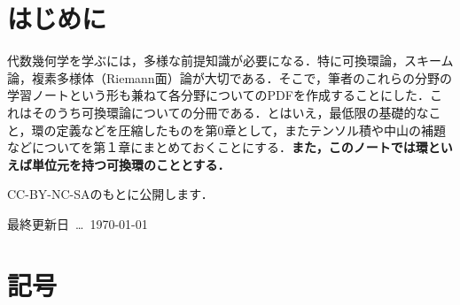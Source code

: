 \documentclass[autodetect-engine,dvi=dvipdfmx,ja=standard,japaram={units}]{bxjsarticle} %
\begin{document}
	\nocite{*}
	\newpage
	\part*{はじめに}
	代数幾何学を学ぶには，多様な前提知識が必要になる．特に可換環論，スキーム論，複素多様体（Riemann面）論が大切である．そこで，筆者のこれらの分野の学習ノートという形も兼ねて各分野についてのPDFを作成することにした．これはそのうち可換環論についての分冊である．とはいえ，最低限の基礎的なこと，環の定義などを圧縮したものを第0章として，またテンソル積や中山の補題などについてを第１章にまとめておくことにする．\textbf{また，このノートでは環といえば単位元を持つ可換環のこととする．}
	
	\hspace*{\fill}CC-BY-NC-SAのもとに公開します．
	{\large
		{\ccLogo}
		{\ccAttribution}
		{\ccNonCommercialJP}
		{\ccShareAlike}}
	
	\hspace*{\fill}最終更新日~\dots~\today
	
	
	
	\part*{記号}
	
	\newpage
	
	\tableofcontents
	
	
	\def\prepartname{付録}
	\def\postpartname{}
	\thepartchange
%	 
	
	
	\printindex
	
	\newpage
	
	
\end{document}
